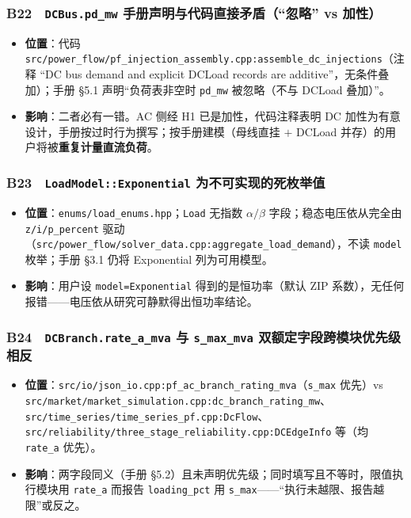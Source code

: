 \documentclass[11pt,a4paper,fontset=fandol]{ctexart}
\newcommand{\file}[1]{\texttt{#1}}
\begin{document}
\subsubsection*{B22　\texttt{DCBus.pd\_mw} 手册声明与代码直接矛盾（``忽略'' vs 加性）}
\begin{itemize}
  \item \textbf{位置}：代码 \file{src/power\_flow/pf\_injection\_assembly.cpp:assemble\_dc\_injections}（注释 ``DC bus demand and explicit DCLoad records are additive''，无条件叠加）；手册 \S 5.1 声明``负荷表非空时 \texttt{pd\_mw} 被忽略（不与 DCLoad 叠加）''。
  \item \textbf{影响}：二者必有一错。AC 侧经 H1 已是加性，代码注释表明 DC 加性为有意设计，手册按过时行为撰写；按手册建模（母线直挂 $+$ DCLoad 并存）的用户将被\textbf{重复计量直流负荷}。
\end{itemize}

\subsubsection*{B23　\texttt{LoadModel::Exponential} 为不可实现的死枚举值}
\begin{itemize}
  \item \textbf{位置}：\file{enums/load\_enums.hpp}；\texttt{Load} 无指数 $\alpha/\beta$ 字段；稳态电压依从完全由 \texttt{z/i/p\_percent} 驱动（\file{src/power\_flow/solver\_data.cpp:aggregate\_load\_demand}），不读 \texttt{model} 枚举；手册 \S 3.1 仍将 Exponential 列为可用模型。
  \item \textbf{影响}：用户设 \texttt{model=Exponential} 得到的是恒功率（默认 ZIP 系数），无任何报错——电压依从研究可静默得出恒功率结论。
\end{itemize}

\subsubsection*{B24　\texttt{DCBranch.rate\_a\_mva} 与 \texttt{s\_max\_mva} 双额定字段跨模块优先级相反}
\begin{itemize}
  \item \textbf{位置}：\file{src/io/json\_io.cpp:pf\_ac\_branch\_rating\_mva}（\texttt{s\_max} 优先）vs \file{src/market/market\_simulation.cpp:dc\_branch\_rating\_mw}、\file{src/time\_series/time\_series\_pf.cpp:DcFlow}、\file{src/reliability/three\_stage\_reliability.cpp:DCEdgeInfo} 等（均 \texttt{rate\_a} 优先）。
  \item \textbf{影响}：两字段同义（手册 \S 5.2）且未声明优先级；同时填写且不等时，限值执行模块用 \texttt{rate\_a} 而报告 \texttt{loading\_pct} 用 \texttt{s\_max}——``执行未越限、报告越限''或反之。
\end{itemize}
\end{document}
